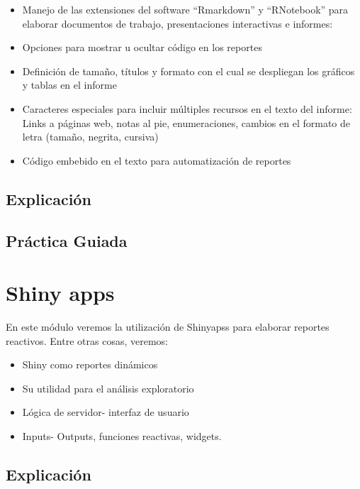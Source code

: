 \documentclass[]{book}
\providecommand{\tightlist}{%
  \setlength{\itemsep}{0pt}\setlength{\parskip}{0pt}}
\begin{document}
\begin{itemize}
\tightlist
\item
  Manejo de las extensiones del software ``Rmarkdown'' y ``RNotebook'' para elaborar documentos de trabajo, presentaciones interactivas e informes:
\item
  Opciones para mostrar u ocultar código en los reportes
\item
  Definición de tamaño, títulos y formato con el cual se despliegan los gráficos y tablas en el informe
\item
  Caracteres especiales para incluir múltiples recursos en el texto del informe: Links a páginas web, notas al pie, enumeraciones, cambios en el formato de letra (tamaño, negrita, cursiva)
\item
  Código embebido en el texto para automatización de reportes
\end{itemize}

\hypertarget{explicacion-4}{%
\section{Explicación}\label{explicacion-4}}

\hypertarget{practica-guiada-4}{%
\section{Práctica Guiada}\label{practica-guiada-4}}

\hypertarget{shiny-apps}{%
\chapter{Shiny apps}\label{shiny-apps}}

En este módulo veremos la utilización de Shinyapss para elaborar reportes reactivos. Entre otras cosas, veremos:

\begin{itemize}
\tightlist
\item
  Shiny como reportes dinámicos
\item
  Su utilidad para el análisis exploratorio
\item
  Lógica de servidor- interfaz de usuario
\item
  Inputs- Outputs, funciones reactivas, widgets.
\end{itemize}

\hypertarget{explicacion-5}{%
\section{Explicación}\label{explicacion-5}}
\end{document}
